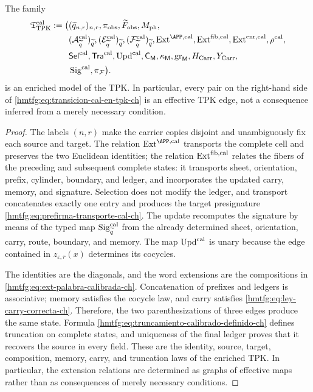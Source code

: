 \begin{proposition}
\label{hmtfg:prop:modelo-tpk-calibrado-ch}
The family
\[
\begin{aligned}
 \mathfrak T_{\rm TPK}^{\rm cal}:=\bigl(
 &(\widetilde q_{n,r})_{n,r},\pi_{\rm obs},
   \widetilde F_{\rm obs},M_{\rm ph},\\
 &(\mathcal A_{\widetilde q}^{\rm cal})_{\widetilde q},
   (\mathcal E_{\widetilde q}^{\rm cal})_{\widetilde q},
   (\mathcal F_{\widetilde q}^{\rm cal})_{\widetilde q},
   \operatorname{Ext}^{\APP,\rm cal},
   \operatorname{Ext}^{\rm fib,cal},
   \operatorname{Ext}^{\rm enr,cal},\rho^{\rm cal},\\
 &\mathsf{Sel}^{\rm cal},\mathsf{Tra}^{\rm cal},
   \operatorname{Upd}^{\rm cal},\mathsf C_{\mathsf M},
   \kappa_{\mathsf M},\operatorname{gr}_{\mathsf M},
   H_{\rm Carr},Y_{\rm Carr},\\
 &\operatorname{Sig}^{\rm cal},\pi_{\mathcal F}\bigr).
\end{aligned}
\]
is an enriched model of the TPK. In particular, every pair on the right-hand
side of \eqref{hmtfg:eq:transicion-cal-en-tpk-ch} is an effective TPK edge, not a
consequence inferred from a merely necessary condition.
\end{proposition}

\begin{proof}
The labels \((n,r)\) make the carrier copies disjoint and unambiguously fix
each source and target. The relation \(\operatorname{Ext}^{\APP,\rm cal}\)
transports the complete cell and preserves the two Euclidean identities; the
relation \(\operatorname{Ext}^{\rm fib,cal}\) relates the fibers of the
preceding and subsequent complete states: it transports sheet, orientation,
prefix, cylinder, boundary, and ledger, and incorporates the updated carry,
memory, and signature. Selection does not modify the ledger, and transport
concatenates exactly one entry and produces the target presignature
\eqref{hmtfg:eq:prefirma-transporte-cal-ch}. The update recomputes the signature by
means of the typed map \(\operatorname{Sig}^{\rm cal}_{\widetilde q}\) from
the already determined sheet, orientation, carry, route, boundary, and memory.
The map \(\operatorname{Upd}^{\rm cal}\) is unary because the edge contained
in \(z_{\varepsilon,r}(x)\) determines its cocycles.

The identities are the diagonals, and the word extensions are the compositions
in \eqref{hmtfg:eq:ext-palabra-calibrada-ch}. Concatenation of prefixes and ledgers
is associative; memory satisfies the cocycle law, and carry satisfies
\eqref{hmtfg:eq:ley-carry-correcta-ch}. Therefore, the two parenthesizations of three
edges produce the same state. Formula
\eqref{hmtfg:eq:truncamiento-calibrado-definido-ch} defines truncation on complete
states, and uniqueness of the final ledger proves that it recovers the source
in every field. These are the identity, source, target, composition, memory,
carry, and truncation laws of the enriched TPK. In particular, the extension
relations are determined as graphs of effective maps rather than as
consequences of merely necessary conditions.
\end{proof}

